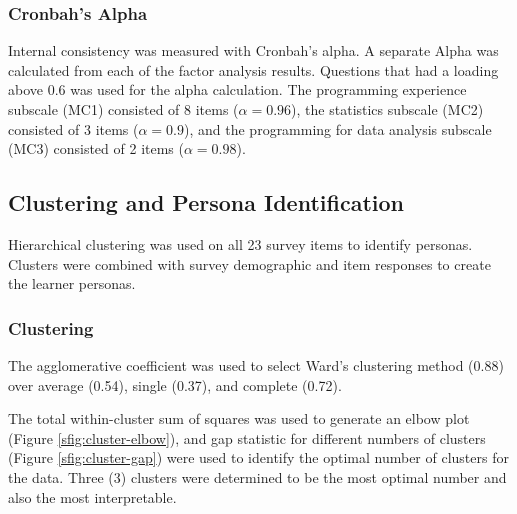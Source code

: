 \documentclass[020-persona\_validation.tex]{subfiles}
\begin{document}
    \subsubsection{Cronbah's Alpha}

        Internal consistency was measured with Cronbah's alpha.
        A separate Alpha was calculated from each of the factor analysis results.
        Questions that had a loading above 0.6 was used for the alpha calculation.
        The programming experience subscale (MC1) consisted of 8 items ($\alpha = 0.96$),
        the statistics subscale (MC2) consisted of 3 items ($\alpha = 0.9$), and
        the programming for data analysis subscale (MC3) consisted of 2 items ($\alpha = 0.98$).
        
    \subsection{Clustering and Persona Identification}
    
        Hierarchical clustering was used on all 23 survey items to identify personas.
        Clusters were combined with survey demographic and item responses to create the learner personas.

    \subsubsection{Clustering}

        The agglomerative coefficient was used to select Ward's clustering method (0.88) over
        average (0.54), single (0.37), and complete (0.72).

        The total within-cluster sum of squares was used to generate an elbow plot (Figure \ref{sfig:cluster-elbow}),
        and gap statistic for different numbers of clusters (Figure \ref{sfig:cluster-gap}) were used to identify
        the optimal number of clusters for the data.
        Three (3) clusters were determined to be the most optimal number and also the most interpretable.
\end{document}

